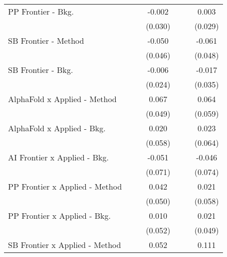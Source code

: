 \begin{tabular}{lcccccc}
   PP Frontier - Bkg.             &               &         & -0.002  &               &               & 0.003\\   
                                  &               &         & (0.030) &               &               & (0.029)\\   
   SB Frontier - Method           &               &         & -0.050  &               &               & -0.061\\   
                                  &               &         & (0.046) &               &               & (0.048)\\   
   SB Frontier - Bkg.             &               &         & -0.006  &               &               & -0.017\\   
                                  &               &         & (0.024) &               &               & (0.035)\\   
   AlphaFold x Applied - Method   &               &         & 0.067   &               &               & 0.064\\   
                                  &               &         & (0.049) &               &               & (0.059)\\   
   AlphaFold x Applied - Bkg.     &               &         & 0.020   &               &               & 0.023\\   
                                  &               &         & (0.058) &               &               & (0.064)\\   
   AI Frontier x Applied - Bkg.   &               &         & -0.051  &               &               & -0.046\\   
                                  &               &         & (0.071) &               &               & (0.074)\\   
   PP Frontier x Applied - Method &               &         & 0.042   &               &               & 0.021\\   
                                  &               &         & (0.050) &               &               & (0.058)\\   
   PP Frontier x Applied - Bkg.   &               &         & 0.010   &               &               & 0.021\\   
                                  &               &         & (0.052) &               &               & (0.049)\\   
   SB Frontier x Applied - Method &               &         & 0.052   &               &               & 0.111\\   

\end{tabular}
